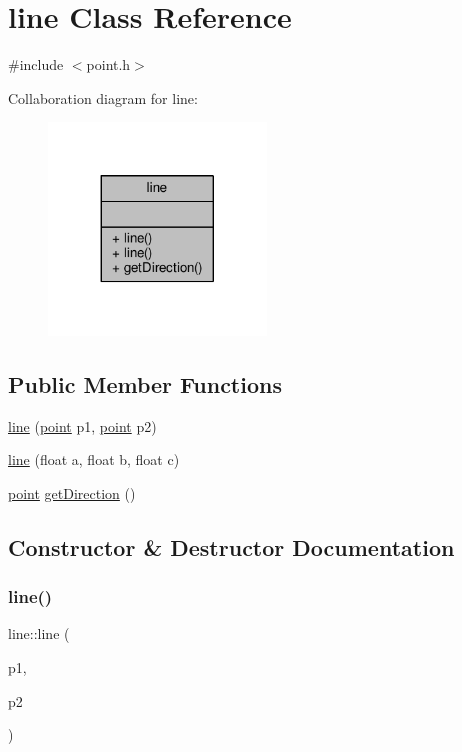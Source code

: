 \hypertarget{classline}{}\section{line Class Reference}
\label{classline}


{\ttfamily \#include $<$point.\+h$>$}



Collaboration diagram for line\+:\nopagebreak
\begin{figure}[H]
\begin{center}
\leavevmode
\includegraphics[width=164pt]{classline__coll__graph}
\end{center}
\end{figure}
\subsection*{Public Member Functions}
\begin{DoxyCompactItemize}
\item 
\mbox{\hyperlink{classline_af35f570d03c98b54683f8d0df5e376dc}{line}} (\mbox{\hyperlink{classpoint}{point}} p1, \mbox{\hyperlink{classpoint}{point}} p2)
\item 
\mbox{\hyperlink{classline_a5c7c332f2c5e4badc9bdfa807b4aef86}{line}} (float a, float b, float c)
\item 
\mbox{\hyperlink{classpoint}{point}} \mbox{\hyperlink{classline_a72da40e3a2e2efaa58ee7a379415b2c5}{get\+Direction}} ()
\end{DoxyCompactItemize}


\subsection{Constructor \& Destructor Documentation}
\mbox{\label{classline_af35f570d03c98b54683f8d0df5e376dc}} 
\subsubsection{\texorpdfstring{line()}{line()}\hspace{0.1cm}{\footnotesize\ttfamily [1/2]}}
{\footnotesize\ttfamily line\+::line (\begin{DoxyParamCaption}\item[{\mbox{\hyperlink{classpoint}{point}}}]{p1,  }\item[{\mbox{\hyperlink{classpoint}{point}}}]{p2 }\end{DoxyParamCaption})}

